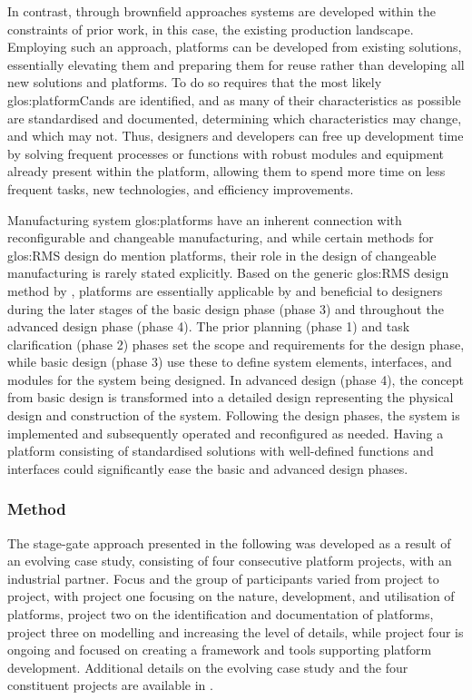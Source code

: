 In contrast, through brownfield approaches systems are developed within the constraints of prior work, in this case, the existing production landscape.
Employing such an approach, platforms can be developed from existing solutions, essentially elevating them and preparing them for reuse rather than developing all new solutions and platforms.
To do so requires that the most likely \gls{glos:platformCand}s are identified, and as many of their characteristics as possible are standardised and documented, determining which characteristics may change, and which may not.
Thus, designers and developers can free up development time by solving frequent processes or functions with robust modules and equipment already present within the platform, allowing them to spend more time on less frequent tasks, new technologies, and efficiency improvements.

Manufacturing system \gls{glos:platform}s have an inherent connection with reconfigurable and changeable manufacturing, and while certain methods for \gls{glos:RMS} design do mention platforms, their role in the design of changeable manufacturing is rarely stated explicitly.
Based on the generic \gls{glos:RMS} design method by \textcite{Andersen2017179}, platforms are essentially applicable by and beneficial to designers during the later stages of the basic design phase (phase 3) and throughout the advanced design phase (phase 4).
The prior planning (phase 1) and task clarification (phase 2) phases set the scope and requirements for the design phase, while basic design (phase 3) use these to define system elements, interfaces, and modules for the system being designed.
In advanced design (phase 4), the concept from basic design is transformed into a detailed design representing the physical design and construction of the system.
Following the design phases, the system is implemented and subsequently operated and reconfigured as needed.
Having a platform consisting of standardised solutions with well-defined functions and interfaces could significantly ease the basic and advanced design phases.

\subsubsection*{Method}
The stage-gate approach presented in the following was developed as a result of an evolving case study, consisting of four consecutive platform projects, with an industrial partner.
Focus and the group of participants varied from project to project, with project one focusing on the nature, development, and utilisation of platforms, project two on the identification and documentation of platforms, project three on modelling and increasing the level of details, while project four is ongoing and focused on creating a framework and tools supporting platform development.
Additional details on the evolving case study and the four constituent projects are available in \parencite{SorensenAPMS2018}.

